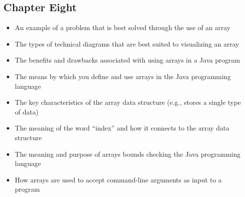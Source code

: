 \vspace*{-.15in}
\subsection*{Chapter Eight}

\begin{itemize}

  \itemsep 0in
  \item An example of a problem that is best solved through the use of an array
  \item The types of technical diagrams that are best suited to visualizing an array
  \item The benefits and drawbacks associated with using arrays in a Java program
  \item The means by which you define and use arrays in the Java programming language
  \item The key characteristics of the array data structure (e.g., stores a single type of data)
  \item The meaning of the word ``index'' and how it connects to the array data structure
  \item The meaning and purpose of arrays bounds checking the Java programming language
  \item How arrays are used to accept command-line arguments as input to a program

  \end{itemize}


